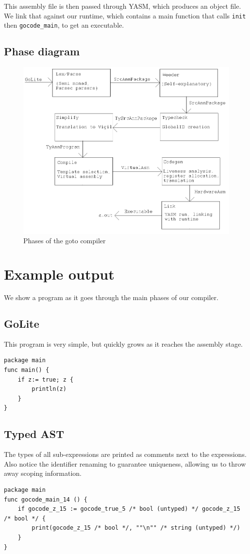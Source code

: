 \documentclass[letterpaper,11pt]{article}
\begin{document}
This assembly file is then passed through YASM, which produces an object file. We link that against our runtime, which contains a main function that calls \texttt{init} then \texttt{gocode\_main}, to get an executable.

\subsection{Phase diagram}
\begin{figure}[ht]
\begin{center}
\includegraphics[width=.6\textwidth]{diagram.png}
\end{center}
\caption{Phases of the goto compiler}
\end{figure}

\section{Example output}
\label{sec:eg}
We show a program as it goes through the main phases of our compiler.
\subsection{GoLite}
This program is very simple, but quickly grows as it reaches the assembly stage.
\begin{verbatim}
package main
func main() {
    if z:= true; z {
        println(z)
    }
}
\end{verbatim}

\subsection{Typed AST}
The types of all sub-expressions are printed as comments next to the expressions. Also notice the identifier renaming to guarantee uniqueness, allowing us to throw away scoping information.
\begin{verbatim}
package main
func gocode_main_14 () {
    if gocode_z_15 := gocode_true_5 /* bool (untyped) */ gocode_z_15 /* bool */ {
        print(gocode_z_15 /* bool */, ""\n"" /* string (untyped) */)
    }
}
\end{verbatim}
\end{document}
